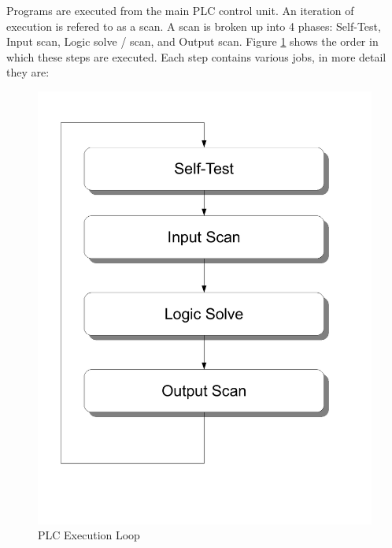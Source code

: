 Programs are executed from the main PLC control unit. An iteration of execution is refered to as a scan. A scan is broken up into 4 phases: Self-Test, Input scan, Logic solve / scan, and Output scan. Figure \ref{fig:plcexecution} shows the order in which these steps are executed. Each step contains various jobs, in more detail they are:


\begin{figure}[htp]
    \centering
    \includegraphics[width=\imgmedphoto]{./images/plcexecution.pdf}
    \caption{PLC Execution Loop}
    \label{fig:plcexecution}
\end{figure}

